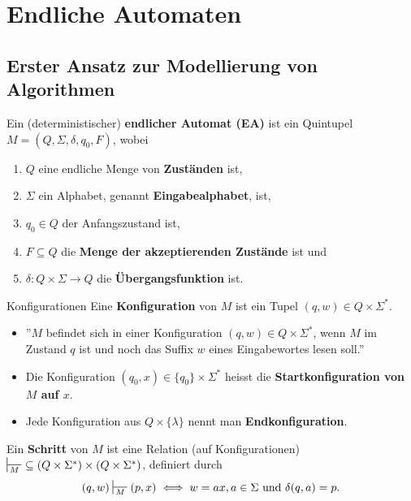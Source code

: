 
\section{Endliche Automaten}

\subsection{Erster Ansatz zur Modellierung von Algorithmen}
\begin{mainbox}{}
    Ein (deterministischer) \textbf{endlicher Automat (EA)} ist ein Quintupel $M = (Q, \Sigma, \delta, q_0, F)$, wobei
    \begin{enumerate}[label=(\roman*)]
        \item $Q$ eine endliche Menge von \textbf{Zuständen} ist,
        \item $\Sigma$ ein Alphabet, genannt \textbf{Eingabealphabet}, ist,
        \item $q_0 \in Q$ der Anfangszustand ist,
        \item $F \subseteq Q$ die \textbf{Menge der akzeptierenden Zustände} ist und
        \item $\delta: Q \times \Sigma \to Q$ die \textbf{Übergangsfunktion} ist.
    \end{enumerate}
\end{mainbox}




\begin{mainbox}{Konfigurationen}
    Eine \textbf{Konfiguration} von $M$ ist ein Tupel $(q, w) \in Q \times \Sigma^*$. 
\end{mainbox}
\begin{itemize}[label=-]
    \item ''$M$ befindet sich in einer Konfiguration $(q,w) \in Q \times \Sigma^*$, wenn $M$ im Zustand $q$ ist und noch das Suffix $w$ eines Eingabewortes lesen soll.''
    \item Die Konfiguration $(q_0, x) \in \{q_0\} \times \Sigma^*$ heisst die \textbf{Startkonfiguration von $M$ auf $x$}.
    \item Jede Konfiguration aus $Q \times \{\lambda\}$ nennt man \textbf{Endkonfiguration}.
\end{itemize}
\begin{mainbox}{}
    Ein \textbf{Schritt} von $M$ ist eine Relation (auf Konfigurationen) $\sststile{M}{} \ \subseteq (Q \times \Sigma^*)\times(Q\times \Sigma^*)$, definiert durch
    $$(q, w) \sststile{M}{}(p, x) \iff w = ax, a \in \Sigma \text{ und }\delta(q, a) = p.$$
\end{mainbox}

